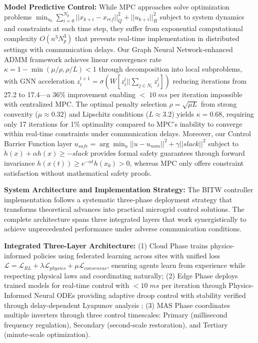 \documentclass[12pt]{article}
\begin{document}
\textbf{Model Predictive Control:} While MPC approaches solve optimization problems $\min_{u_k} \sum_{i=0}^{N_p} ||x_{k+i} - x_{ref}||^2_Q + ||u_{k+i}||^2_R$ subject to system dynamics and constraints at each time step, they suffer from exponential computational complexity $O(n^3 N_p^3)$ that prevents real-time implementation in distributed settings with communication delays. Our Graph Neural Network-enhanced ADMM framework achieves linear convergence rate $\kappa = 1 - \min(\mu/\rho, \rho/L) < 1$ through decomposition into local subproblems, with GNN acceleration $z^{l+1}_i = \sigma(W[z^l_i || \sum_{j \in N_i} z^l_j])$ reducing iterations from 27.2 to 17.4---a 36\% improvement enabling $<\;10\;ms$ per iteration impossible with centralized MPC. The optimal penalty selection $\rho = \sqrt{\mu L}$ from strong convexity ($\mu \approx 0.32$) and Lipschitz conditions ($L \approx 3.2$) yields $\kappa = 0.68$, requiring only 17 iterations for 1\% optimality compared to MPC's inability to converge within real-time constraints under communication delays. Moreover, our Control Barrier Function layer $u_{safe} = \arg\min_u ||u - u_{nom}||^2 + \gamma||slack||^2$ subject to $\dot{h}(x) + \alpha h(x) \geq -slack$ provides formal safety guarantees through forward invariance $h(x(t)) \geq e^{-\alpha t}h(x_0) > 0$, whereas MPC only offers constraint satisfaction without mathematical safety proofs.

\textbf{System Architecture and Implementation Strategy:} The BITW controller implementation follows a systematic three-phase deployment strategy that transforms theoretical advances into practical microgrid control solutions. The complete architecture spans three integrated layers that work synergistically to achieve unprecedented performance under adverse communication conditions.

\textbf{Integrated Three-Layer Architecture:} (1) Cloud Phase trains physics-informed policies using federated learning across sites with unified loss $\mathcal{L} = \mathcal{L}_{RL} + \lambda \mathcal{L}_{physics} + \mu \mathcal{L}_{consensus}$, ensuring agents learn from experience while respecting physical laws and coordinating naturally; (2) Edge Phase deploys trained models for real-time control with $< 10\;ms$ per iteration through Physics-Informed Neural ODEs providing adaptive droop control with stability verified through delay-dependent Lyapunov analysis \cite{fridman2014}; (3) MAS Phase coordinates multiple inverters through three control timescales: Primary (millisecond frequency regulation), Secondary (second-scale restoration), and Tertiary (minute-scale optimization).
\end{document}
